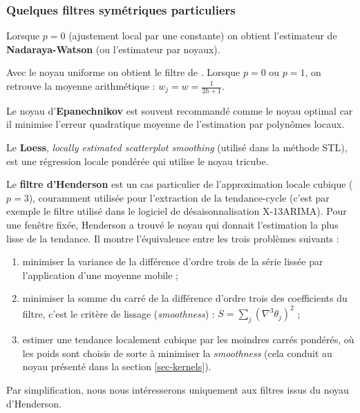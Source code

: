 \documentclass[
  11pt,
  french,
  a4paper]{article}
\providecommand{\tightlist}{%
  \setlength{\itemsep}{0pt}\setlength{\parskip}{0pt}}
\newcommand\1{\mathds{1}}
\begin{document}
\hypertarget{sec-sympolyfilter}{%
\subsubsection{Quelques filtres symétriques particuliers}\label{sec-sympolyfilter}}

Lorsque \(p=0\) (ajustement local par une constante) on obtient l'estimateur de \textbf{Nadaraya-Watson} (ou l'estimateur par noyaux).

Avec le noyau uniforme on obtient le filtre de \textcite{macaulay1931smoothing}.
Lorsque \(p=0\) ou \(p=1\), on retrouve la moyenne arithmétique : \(w_j=w=\frac{1}{2h+1}\).

Le noyau d'\textbf{Epanechnikov} est souvent recommandé comme le noyau optimal car il minimise l'erreur quadratique moyenne de l'estimation par polynômes locaux.

Le \textbf{Loess}, \emph{locally estimated scatterplot smoothing} (utilisé dans la méthode STL), est une régression locale pondérée qui utilise le noyau tricube.

Le \textbf{filtre d'Henderson} est un cas particulier de l'approximation locale cubique (\(p=3\)), couramment utilisée pour l'extraction de la tendance-cycle (c'est par exemple le filtre utilisé dans le logiciel de désaisonnalisation X-13ARIMA).
Pour une fenêtre fixée, Henderson a trouvé le noyau qui donnait l'estimation la plus lisse de la tendance.
Il montre l'équivalence entre les trois problèmes suivants :

\begin{enumerate}
\def\labelenumi{\arabic{enumi}.}
\tightlist
\item
  minimiser la variance de la différence d'ordre trois de la série lissée par l'application d'une moyenne mobile ;\\
\item
  minimiser la somme du carré de la différence d'ordre trois des coefficients du filtre, c'est le critère de lissage (\emph{smoothness}) : \(S=\sum_j(\nabla^{3}\theta_{j})^{2}\) ;\\
\item
  estimer une tendance localement cubique par les moindres carrés pondérés, où les poids sont choisis de sorte à minimiser la \emph{smoothness} (cela conduit au noyau présenté dans la section \ref{sec-kernels}).
\end{enumerate}

Par simplification, nous nous intéresserons uniquement aux filtres issus du noyau d'Henderson.
\end{document}
